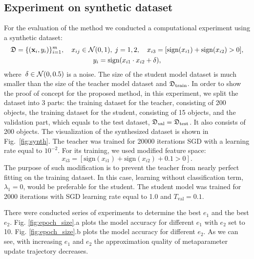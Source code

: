 \documentclass[runningheads]{llncs}
\begin{document}
 
\subsection{Experiment on synthetic dataset}
For the evaluation of the method we conducted a computational experiment using a synthetic dataset:
\begin{gather*}
    \mathfrak{D} = \{(\mathbf{x}_i, y_i)\}_{i=1}^{m}, \quad x_{ij} \in \mathcal{N}(0, 1),\; j=1, 2, \quad x_{i3} = [\text{sign}(x_{i1})+\text{sign}(x_{i2})>0],\\
    y_i = \text{sign}(x_{i1}\cdot x_{i2}+\delta),
\end{gather*}
where~$\delta \in \mathcal{N}(0, 0.5)$ is a noise. The size of the student model dataset is much smaller than the size of the teacher model dataset and $\mathfrak{D}_\text{train}$. In order to show the proof of concept for the proposed method, in this experiment, we split the dataset into 3 parts: the training dataset for the teacher, consisting of 200 objects, the training dataset for the student, consisting of 15 objects, and the validation part, which equals to the test dataset, $\mathfrak{D}_\text{val} = \mathfrak{D}_\text{test}$. It also consists of 200 objects. The visualization of the synthesized dataset is shown in Fig.~\ref{fig:synth}. The teacher was trained for 20000 iterations SGD with a learning rate equal to $10^{-2}.$ For its training, we used modified feature space:
\[
    x_{i3} = [\text{sign}(x_{i1})+\text{sign}(x_{i2}) + 0.1 >0].
\]
The purpose of such  modification is to prevent the teacher from nearly perfect fitting on the training dataset. In this case, learning without classification term, $\lambda_1 = 0$, would be preferable for the student.   The student model was trained for 2000 iterations with SGD learning rate equal to 1.0 and $T_\text{val} = 0.1.$

There were conducted series of experiments to determine the best $e_1$ and the best $e_2$. Fig. \ref{fig:epoch_size}.a plots the model accuracy for different $e_1$ with $e_2$ set to 10. Fig. \ref{fig:epoch_size}.b plots the model accuracy for different $e_2$. As we can see, with increasing $e_1$ and $e_2$ the approximation quality of metaparameter update trajectory  decreases.
\end{document}
